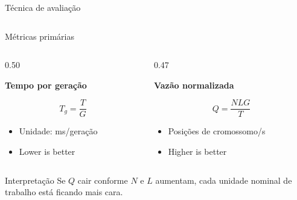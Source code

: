 \documentclass[aspectratio=169,11pt]{beamer}
\begin{document}
\begin{frame}{Técnica de avaliação}
\begin{columns}[T,onlytextwidth]
    \end{columns}

\end{frame}


\begin{frame}{Métricas primárias}

    \begin{columns}[T,onlytextwidth]

        \begin{column}{0.50\textwidth}

            \textbf{Tempo por geração}

            \[
                T_g = \frac{T}{G}
            \]

            \begin{itemize}
                \item Unidade: ms/geração
                \item Lower is better
            \end{itemize}

        \end{column}

        \begin{column}{0.47\textwidth}

            \textbf{Vazão normalizada}

            \[
                Q = \frac{NLG}{T}
            \]

            \begin{itemize}
                \item Posições de cromossomo/s
                \item Higher is better
            \end{itemize}

        \end{column}

    \end{columns}

    \vspace{0.22cm}

    \begin{questionbox}{Interpretação}
        Se $Q$ cair conforme $N$ e $L$ aumentam, cada unidade nominal
        de trabalho está ficando mais cara.
    \end{questionbox}

\end{frame}
\end{document}
